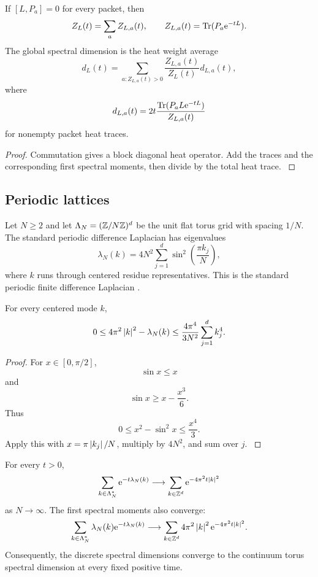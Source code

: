 \begin{proposition}\label{strong:proposition:010}\label{strong:prop:heat_packets}
If \([L,P_a]=0\) for every packet, then
\[
Z_L(t)=\sum_aZ_{L,a}(t),
\qquad
Z_{L,a}(t)=\operatorname{Tr}(P_a\mathrm e^{-tL}).
\]
The global spectral dimension is the heat weight average
\[
d_L(t)
=
\sum_{a:Z_{L,a}(t)>0}
\frac{Z_{L,a}(t)}{Z_L(t)}
 d_{L,a}(t),
\]
where
\[
d_{L,a}(t)
=2t
\frac{\operatorname{Tr}(P_aL\mathrm e^{-tL})}{Z_{L,a}(t)}
\]
for nonempty packet heat traces.
\end{proposition}

\begin{proof}\label{strong:proof:063}
Commutation gives a block diagonal heat operator. Add the traces and the corresponding first spectral moments, then divide by the total heat trace.
\label{strong:proof:063:end}\end{proof}

\subsection{Periodic lattices}\label{strong:subsec:periodic_lattices}

Let \(N\geq2\) and let \(\Lambda_N=(\mathbb Z/N\mathbb Z)^d\) be the unit flat torus grid with spacing \(1/N\). The standard periodic difference Laplacian has eigenvalues
\[
\lambda_N(k)
=
4N^2
\sum_{j=1}^{d}
\sin^2\left(\frac{\pi k_j}{N}\right),
\]
where \(k\) runs through centered residue representatives. This is the standard periodic finite difference Laplacian \cite{Strikwerda2004}.

\begin{theorem}\label{strong:theorem:039}\label{strong:thm:dispersion_bound}
For every centered mode \(k\),
\[
0
\leq
4\pi^2\left\lvert k\right\rvert^2-\lambda_N(k)
\leq
\frac{4\pi^4}{3N^2}
\sum_{j=1}^{d}k_j^4.
\]
\end{theorem}

\begin{proof}\label{strong:proof:064}
For \(x\in[0,\pi/2]\),
\[
\sin x\leq x
\]
and
\[
\sin x\geq x-\frac{x^3}{6}.
\]
Thus
\[
0\leq x^2-\sin^2x\leq\frac{x^4}{3}.
\]
Apply this with \(x=\pi\left\lvert k_j\right\rvert/N\), multiply by \(4N^2\), and sum over \(j\).
\label{strong:proof:064:end}\end{proof}

\begin{theorem}\label{strong:theorem:040}\label{strong:thm:heat_trace_convergence}
For every \(t>0\),
\[
\sum_{k\in\Lambda_N^*}
\mathrm e^{-t\lambda_N(k)}
\longrightarrow
\sum_{k\in\mathbb Z^d}
\mathrm e^{-4\pi^2t\left\lvert k\right\rvert^2}
\]
as \(N\to\infty\). The first spectral moments also converge:
\[
\sum_{k\in\Lambda_N^*}
\lambda_N(k)\mathrm e^{-t\lambda_N(k)}
\longrightarrow
\sum_{k\in\mathbb Z^d}
4\pi^2\left\lvert k\right\rvert^2\mathrm e^{-4\pi^2t\left\lvert k\right\rvert^2}.
\]
Consequently, the discrete spectral dimensions converge to the continuum torus spectral dimension at every fixed positive time.
\end{theorem}

